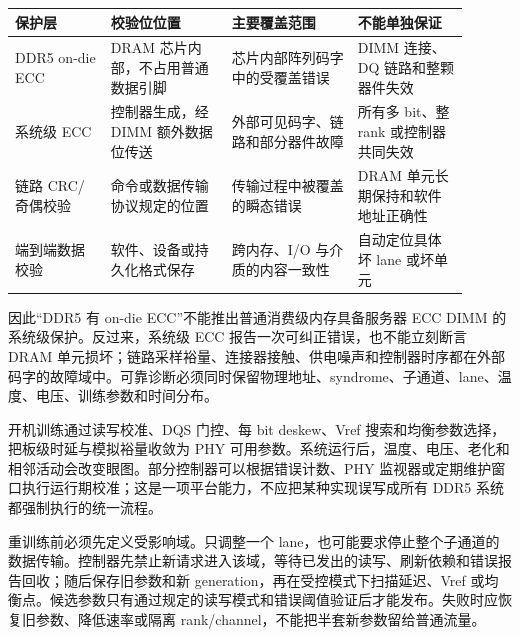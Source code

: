 \begin{longtable}{L{0.19\linewidth}L{0.24\linewidth}L{0.25\linewidth}L{0.22\linewidth}}
\toprule
保护层 & 校验位位置 & 主要覆盖范围 & 不能单独保证 \\
\midrule
DDR5 on-die ECC & DRAM 芯片内部，不占用普通数据引脚 & 芯片内部阵列码字中的受覆盖错误 & DIMM 连接、DQ 链路和整颗器件失效 \\\tablerowrule
系统级 ECC & 控制器生成，经 DIMM 额外数据位传送 & 外部可见码字、链路和部分器件故障 & 所有多 bit、整 rank 或控制器共同失效 \\\tablerowrule
链路 CRC/奇偶校验 & 命令或数据传输协议规定的位置 & 传输过程中被覆盖的瞬态错误 & DRAM 单元长期保持和软件地址正确性 \\\tablerowrule
端到端数据校验 & 软件、设备或持久化格式保存 & 跨内存、I/O 与介质的内容一致性 & 自动定位具体坏 lane 或坏单元 \\
\bottomrule
\end{longtable}

因此“DDR5 有 on-die ECC”不能推出普通消费级内存具备服务器 ECC DIMM 的系统级保护。反过来，系统级 ECC 报告一次可纠正错误，也不能立刻断言 DRAM 单元损坏；链路采样裕量、连接器接触、供电噪声和控制器时序都在外部码字的故障域中。可靠诊断必须同时保留物理地址、syndrome、子通道、lane、温度、电压、训练参数和时间分布。


开机训练通过读写校准、DQS 门控、每 bit deskew、Vref 搜索和均衡参数选择，把板级时延与模拟裕量收敛为 PHY 可用参数。系统运行后，温度、电压、老化和相邻活动会改变眼图。部分控制器可以根据错误计数、PHY 监视器或定期维护窗口执行运行期校准；这是一项平台能力，不应把某种实现误写成所有 DDR5 系统都强制执行的统一流程。

重训练前必须先定义受影响域。只调整一个 lane，也可能要求停止整个子通道的数据传输。控制器先禁止新请求进入该域，等待已发出的读写、刷新依赖和错误报告回收；随后保存旧参数和新 generation，再在受控模式下扫描延迟、Vref 或均衡点。候选参数只有通过规定的读写模式和错误阈值验证后才能发布。失败时应恢复旧参数、降低速率或隔离 rank/channel，不能把半套新参数留给普通流量。

